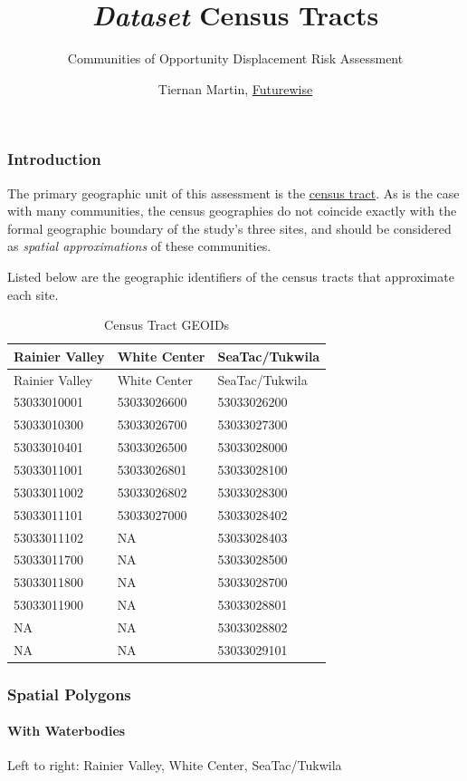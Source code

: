 \documentclass[]{article}
\title{\emph{Dataset} \textbar{} Census Tracts}
\subtitle{Communities of Opportunity Displacement Risk Assessment}
\author{Tiernan Martin, \href{http://www.futurewisewa.org/}{Futurewise}}
\date{}
\let\oldparagraph\paragraph
\renewcommand{\paragraph}[1]{\oldparagraph{#1}\mbox{}}
\begin{document}
\maketitle

\subsubsection{Introduction}\label{introduction}

The primary geographic unit of this assessment is the
\href{https://www.census.gov/geo/reference/gtc/gtc_ct.html}{census
tract}. As is the case with many communities, the census geographies do
not coincide exactly with the formal geographic boundary of the study's
three sites, and should be considered as \emph{spatial approximations}
of these communities.

Listed below are the geographic identifiers of the census tracts that
approximate each site.

\begin{longtable}[]{@{}lll@{}}
\caption{Census Tract GEOIDs}\tabularnewline
\toprule
Rainier Valley & White Center & SeaTac/Tukwila\tabularnewline
\midrule
\endfirsthead
\toprule
Rainier Valley & White Center & SeaTac/Tukwila\tabularnewline
\midrule
\endhead
53033010001 & 53033026600 & 53033026200\tabularnewline
53033010300 & 53033026700 & 53033027300\tabularnewline
53033010401 & 53033026500 & 53033028000\tabularnewline
53033011001 & 53033026801 & 53033028100\tabularnewline
53033011002 & 53033026802 & 53033028300\tabularnewline
53033011101 & 53033027000 & 53033028402\tabularnewline
53033011102 & NA & 53033028403\tabularnewline
53033011700 & NA & 53033028500\tabularnewline
53033011800 & NA & 53033028700\tabularnewline
53033011900 & NA & 53033028801\tabularnewline
NA & NA & 53033028802\tabularnewline
NA & NA & 53033029101\tabularnewline
\bottomrule
\end{longtable}

\subsubsection{Spatial Polygons}\label{spatial-polygons}

\paragraph{With Waterbodies}\label{with-waterbodies}

Left to right: Rainier Valley, White Center, SeaTac/Tukwila
\end{document}
